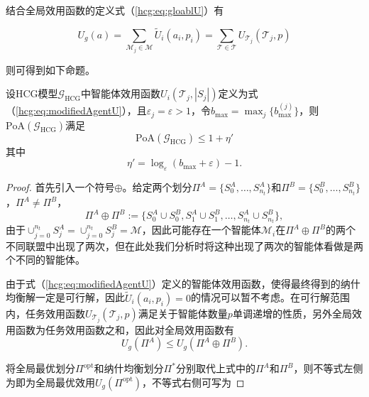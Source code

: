 结合全局效用函数的定义式（\ref{hcg:eq:gloablU}）有

\begin{equation}
\label{hcg:eq:taskU_to_globalU}
	U_g(a) = \sum_{\mathcal{M}_j \in \mathcal{M}}\widetilde U_i(a_i,p_i) = \sum_{\mathcal{T} \in \mathcal{T}} U_{\mathcal{T}_j}(\mathcal{T}_j,p)
\end{equation}

则可得到如下命题。

\begin{proposition}
	设HCG模型$\mathcal{G}_{\text{HCG}}$中智能体效用函数$U_i(\mathcal{T}_j,|S_j|)$定义为式（\ref{hcg:eq:modifiedAgentU}），且$\varepsilon_j=\varepsilon>1$，令$b_{\text{max}}=\max_j \{b_{\text{max}}^{(j)}\}$，则$\mathrm{PoA}(\mathcal{G}_{\text{HCG}})$满足
	\begin{equation}
	\label{hcg:eq:PoAforU}
		\mathrm{PoA}(\mathcal{G}_{\text{HCG}}) \leq 1 + \eta'
	\end{equation}
	其中
	\begin{equation}
	\label{hcg:pro:eq:etapie}
		\eta' = \log_{\varepsilon}(b_{\text{max}}+\varepsilon) -1. 
	\end{equation}
	
	
	\begin{proof}
		首先引入一个符号$\oplus$。给定两个划分$\Pi^A = \{S_0^A,\dots,S_{n_t}^A\}$和$\Pi^B = \{S_0^B,\dots,S_{n_t}^B\}$，$\Pi^A \neq \Pi^B$，
		\begin{equation}
		\label{hcg:pro:eq:oplus}
			\Pi^A \oplus \Pi^B := \{S_0^A \cup S_0^B, S_1^A \cup S_1^B, \dots, S_{n_t}^A \cup S_{n_t}^B \},
		\end{equation}
		由于$\cup_{j=0}^{n_t} S_j^A = \cup_{j=0}^{n_t} S_j^B = \mathcal{M}$，因此可能存在一个智能体$\mathcal{M}_i$在$\Pi^A \oplus \Pi^B$的两个不同联盟中出现了两次，但在此处我们分析时将这种出现了两次的智能体看做是两个不同的智能体。
		
		由于式（\ref{hcg:eq:modifiedAgentU}）定义的智能体效用函数，使得最终得到的纳什均衡解一定是可行解，因此$\widetilde U_i(a_i,p_i)=0$的情况可以暂不考虑。在可行解范围内，任务效用函数$U_{\mathcal{T}_j}(\mathcal{T}_j,p)$满足关于智能体数量$p$单调递增的性质，另外全局效用函数为任务效用函数之和，因此对全局效用函数有
		\begin{equation}
		\label{hcg:pro:eq:oplus_inequility}
			U_g(\Pi^A) \leq U_g(\Pi^A \oplus \Pi^B).
		\end{equation}
		
		将全局最优划分$\Pi^{\text{opt}}$和纳什均衡划分$\Pi^*$分别取代上式中的$\Pi^A$和$\Pi^B$，则不等式左侧为即为全局最优效用$U_g(\Pi^{\text{opt}})$，不等式右侧可写为
		

\end{proof}
\end{proposition}
